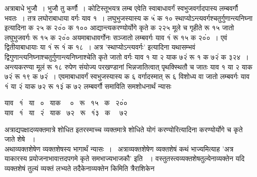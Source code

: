 \documentclass[11pt, openany]{book}
\begin{document}
\begin{sloppypar}
\noindent अत्राबाधे भुजौ~। भुजौ तु कर्णौ~। कोटिस्तूभयत्र लम्ब एवेति स्वाबाधावर्गं स्वभुजवर्गादपास्य लम्बवर्गौ भवतः~। तत्र लघोराबाधाया वर्गः याव १~। लघुभुजस्यास्य क ५ं क १० स्थाप्योऽन्त्यवर्गश्चतुर्गुणान्त्यनिघ्ना इत्यादिना क २५ क २०ं० क १०० आद्यान्त्यकरण्योर्योगे कृते क २२५ मूले च गृहीते रू १५ जातो लघुभुजवर्गः रू १५ क २०ं० अयमाबाधावर्गोनः सञ्जातो लम्बवर्गः याव १ं रू १५ क २०ं०~। एवं द्वितीयाबाधायाः या १ं रू १ं क १८~। अत्र {\color{violet}'स्थाप्योऽन्त्यवर्गः'} इत्यादिना यथासम्भवं द्विगुणान्त्यनिघ्नाश्चतुर्गुणान्त्यनिघ्नाश्चेति कृते जातो वर्गः याव १ या २ याक ७२ं रू १ क ७२ं क ३२४~। अन्त्यकरण्या मूलं रू १८ रुपेण संयोज्य परखण्डानां भिन्नजातित्वात् पृथक्स्थितौ च जातः याव १ या २ याक ७२ं रू १९ क ७२ं~। एवमाबाधावर्गं स्वभुजस्यास्य क ६ वर्गादस्मात् रू ६ विशोध्य वा जातो लम्बवर्गः याव १ं या २ं याक ७२ रू १३ं क ७२ लम्बवर्गौ समाविति समशोधनार्थं न्यासः
\vspace{-1mm}

\begin{center}
याव ~१ं ~या ~० ~याक ~~० ~रू ~१५ ~क ~२०ं०\\
याव ~१ं ~या ~२ं ~याक ~७२ ~रू ~१ं३ ~क ~~७२
\end{center}
\vspace{-1mm}

\noindent अत्राद्यपक्षादव्यक्तमात्रे शोधित इतरस्माच्च व्यक्तमात्रे शोधिते योगं करण्योरित्यादिना करण्योर्योगे च कृते जाते शेषे ~। \\

\noindent अथाव्यक्तशेषेण व्यक्तशेषस्य भागार्थं न्यासः~। \, अत्राव्यक्तशेषेण व्यक्तशेषं कथं भाज्यमित्याह 'अत्र याकारस्य प्रयोजनाभावात्तदपगमे कृते समभाज्यभाजकौ' इति ~। वस्तुतस्त्वव्यक्तशेषतुल्येनाव्यक्तेन यदि व्यक्तशेषं तुल्यं व्यक्तं लभ्यते तदैकेनाव्यक्तेन किमिति त्रैराशिकेन \\
\vspace{-2mm}


\end{sloppypar}
\end{document}
